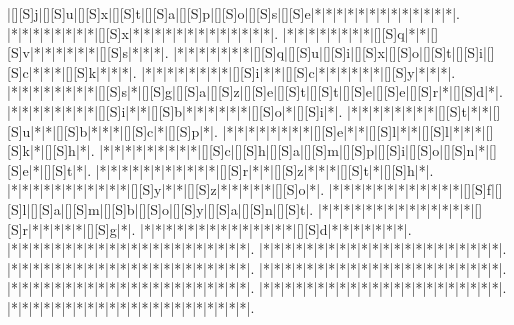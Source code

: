 \documentclass{article}
\begin{document}
\newpage
\begin{Puzzle}{22}{22}
|[][S]j|[][S]u|[][S]x|[][S]t|[][S]a|[][S]p|[][S]o|[][S]s|[][S]e|*|*|*|*|*|*|*|*|*|*|*|*|*|.
|*|*|*|*|*|*|*|*|[][S]x|*|*|*|*|*|*|*|*|*|*|*|*|*|.
|*|*|*|*|*|*|*|*|[][S]q|*|*|[][S]v|*|*|*|*|*|*|[][S]s|*|*|*|.
|*|*|*|*|*|*|*|[][S]q|[][S]u|[][S]i|[][S]x|[][S]o|[][S]t|[][S]i|[][S]c|*|*|*|[][S]k|*|*|*|.
|*|*|*|*|*|*|*|*|[][S]i|*|*|[][S]c|*|*|*|*|*|*|[][S]y|*|*|*|.
|*|*|*|*|*|*|*|*|[][S]s|*|[][S]g|[][S]a|[][S]z|[][S]e|[][S]t|[][S]t|[][S]e|[][S]e|[][S]r|*|[][S]d|*|.
|*|*|*|*|*|*|*|*|[][S]i|*|*|[][S]b|*|*|*|*|*|*|[][S]o|*|[][S]i|*|.
|*|*|*|*|*|*|*|*|[][S]t|*|*|[][S]u|*|*|[][S]b|*|*|*|[][S]c|*|[][S]p|*|.
|*|*|*|*|*|*|*|*|[][S]e|*|*|[][S]l|*|*|[][S]l|*|*|*|[][S]k|*|[][S]h|*|.
|*|*|*|*|*|*|*|*|*|[][S]c|[][S]h|[][S]a|[][S]m|[][S]p|[][S]i|[][S]o|[][S]n|*|[][S]e|*|[][S]t|*|.
|*|*|*|*|*|*|*|*|*|*|*|[][S]r|*|*|[][S]z|*|*|*|[][S]t|*|[][S]h|*|.
|*|*|*|*|*|*|*|*|*|*|*|[][S]y|*|*|[][S]z|*|*|*|*|*|[][S]o|*|.
|*|*|*|*|*|*|*|*|*|*|*|*|[][S]f|[][S]l|[][S]a|[][S]m|[][S]b|[][S]o|[][S]y|[][S]a|[][S]n|[][S]t|.
|*|*|*|*|*|*|*|*|*|*|*|*|*|*|[][S]r|*|*|*|*|*|[][S]g|*|.
|*|*|*|*|*|*|*|*|*|*|*|*|*|*|[][S]d|*|*|*|*|*|*|*|.
|*|*|*|*|*|*|*|*|*|*|*|*|*|*|*|*|*|*|*|*|*|*|.
|*|*|*|*|*|*|*|*|*|*|*|*|*|*|*|*|*|*|*|*|*|*|.
|*|*|*|*|*|*|*|*|*|*|*|*|*|*|*|*|*|*|*|*|*|*|.
|*|*|*|*|*|*|*|*|*|*|*|*|*|*|*|*|*|*|*|*|*|*|.
|*|*|*|*|*|*|*|*|*|*|*|*|*|*|*|*|*|*|*|*|*|*|.
|*|*|*|*|*|*|*|*|*|*|*|*|*|*|*|*|*|*|*|*|*|*|.
|*|*|*|*|*|*|*|*|*|*|*|*|*|*|*|*|*|*|*|*|*|*|.
\end{Puzzle}
\end{document}
